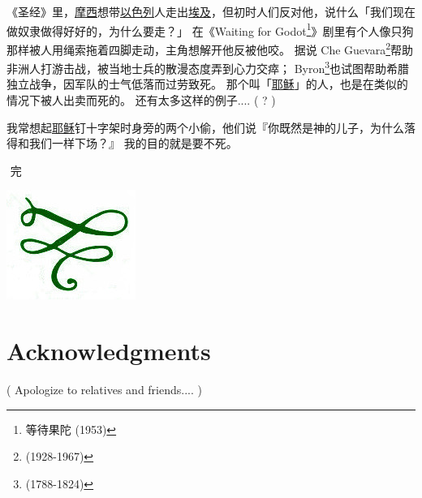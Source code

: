 \documentclass[12pt]{report}
\newcommand*\dashh{\textemdash\,\,}
\begin{document}
《圣经》里，\uline{摩西}想带\uline{以色列}人走出\uline{埃及}，但初时人们反对他，说什么「我们现在做奴隶做得好好的，为什么要走？」 在《Waiting for Godot\footnote{等待果陀 (1953)}》剧里有个人像只狗那样被人用绳索拖着四脚走动，主角想解开他反被他咬。 据说 Che Guevara\footnote{(1928-1967)}帮助非洲人打游击战，被当地士兵的散漫态度弄到心力交瘁； Byron\footnote{(1788-1824)}也试图帮助希腊独立战争，因军队的士气低落而过劳致死。 那个叫「\uline{耶稣}」的人，也是在类似的情况下被人出卖而死的。 还有太多这样的例子.... ( ? )

我常想起\uline{耶稣}钉十字架时身旁的两个小偷，他们说『你既然是神的儿子，为什么落得和我们一样下场？』 我的目的就是要不死。

\begin{center}
\dashh 完 \dashh \par

\includegraphics[scale=0.5]{vignette0.jpg}
\end{center}


\chapter*{Acknowledgments}

( Apologize to relatives and friends.... )

%

\onecolumn

\end{document}
